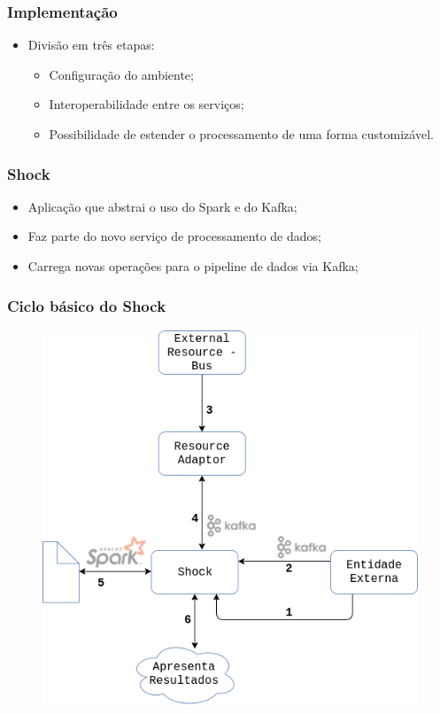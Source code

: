 \documentclass{beamer}
\begin{document}
  \begin{frame}
      \frametitle{Implementação}
      \begin{itemize}
          \item Divisão em três etapas:
              \begin{itemize}
                  \item Configuração do ambiente;
                  \item Interoperabilidade entre os serviços;
                  \item Possibilidade de estender o processamento de uma forma customizável.
              \end{itemize}
      \end{itemize}
  \end{frame}

  \begin{frame}
      \frametitle{Shock}
      \begin{itemize}
          \item Aplicação que abstrai o uso do Spark e do Kafka;
          \item Faz parte do novo serviço de processamento de dados;
          \item Carrega novas operações para o pipeline de dados via Kafka;
      \end{itemize}
  \end{frame}

  \begin{frame}
      \frametitle{Ciclo básico do Shock}
          \begin{figure}
              \includegraphics[scale=0.3]{figures/shock.png}
          \end{figure}
  \end{frame}
\end{document}
